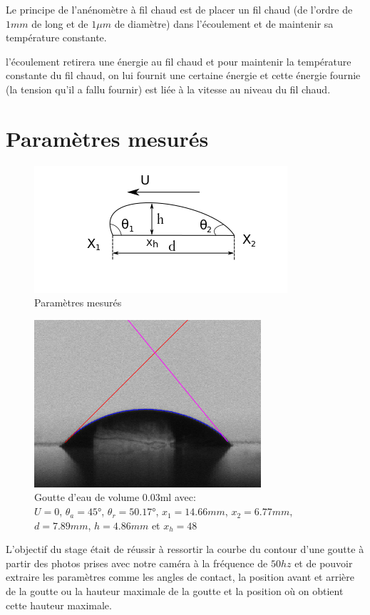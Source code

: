 \documentclass[french]{article}
\begin{document}
Le principe de l'anénomètre à fil chaud est de placer un fil chaud (de l'ordre de $1mm$ de long et de $1\mu m$ de diamètre) dans l'écoulement et de maintenir sa température constante.

l'écoulement retirera une énergie au fil chaud et pour maintenir la température constante du fil chaud, on lui fournit une certaine énergie et cette énergie fournie (la tension qu'il a fallu fournir) est liée à la vitesse au niveau du fil chaud.


\section{Paramètres mesurés}

\begin{figure}[ht]
	\centering
	\includegraphics[scale = 1]{./image/rrgou2.png}
	\caption{Paramètres mesurés}
\end{figure}
\begin{figure}[ht]
	\centering
	\includegraphics[scale = 0.5]{./image/crop_tvitesse=28_volume=003.png}
	\caption{Goutte d'eau de volume $0.03$ml avec: \\$U = 0$, $\theta_{a} = \ang{45}$, $\theta_{r} = \ang{50.17}$, $x_{1} = 14.66mm$, $x_{2} = 6.77mm$,\\ $d = 7.89mm$, $h = 4.86mm$ et $x_{h} = 48$}
\end{figure}


L'objectif du stage était de réussir à ressortir la courbe du contour d'une goutte à partir des photos prises avec notre caméra à la fréquence de $50hz$ et de pouvoir extraire les paramètres comme les angles de contact, la position avant et arrière de la goutte ou la hauteur maximale de la goutte et la position où on obtient cette hauteur maximale.
\end{document}
